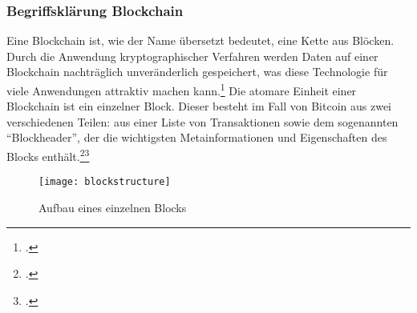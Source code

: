 \subsubsection{Begriffsklärung Blockchain} \label{toc:kryptowaehrungenundblockchain}

Eine Blockchain ist, wie der Name übersetzt bedeutet, eine Kette aus Blöcken. Durch die Anwendung kryptographischer
Verfahren werden Daten auf einer Blockchain nachträglich unveränderlich gespeichert, was diese Technologie für viele
Anwendungen attraktiv machen kann.\footcite[Vgl.][S. 1]{friedlmaier2018disrupting} Die atomare Einheit einer Blockchain
ist ein einzelner Block. Dieser besteht im Fall von Bitcoin aus zwei verschiedenen Teilen: aus einer Liste von Transaktionen
sowie dem sogenannten "`Blockheader"', der die wichtigsten Metainformationen und Eigenschaften des Blocks
enthält.\footcite[Vgl.][S. 48]{bhaskar2015bitcoin}\footcite[Vgl.][S. 4]{nakamoto2008bitcoin}

\begin{figure}[H]
    \caption{Aufbau eines einzelnen Blocks}
    \texttt{[image: blockstructure]}
    \label{figure:blockstructure}
    \\
    \cite[Quelle: In Anlehnung an][S. 4]{nakamoto2008bitcoin}
\end{figure}

